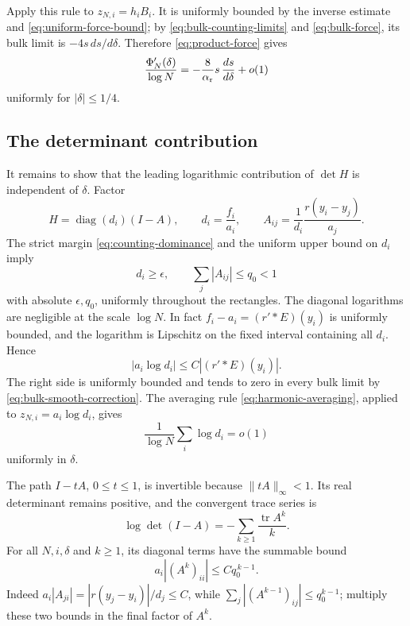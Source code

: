Apply this rule to \(z_{N,i}=h_iB_i\). It is uniformly bounded by the inverse estimate and \eqref{eq:uniform-force-bound}; by
\eqref{eq:bulk-counting-limits} and \eqref{eq:bulk-force}, its bulk limit is
\(-4s\,ds/d\delta\). Therefore \eqref{eq:product-force} gives
\begin{equation}\label{eq:uniform-product-derivative}
 \frac{\Phi_N'(\delta)}{\log N}
 =-\frac8{\alpha_{\rm r}}s\,\frac{ds}{d\delta}+o(1)
\end{equation}
uniformly for \(|\delta|\le1/4\).

\subsection{The determinant contribution}

It remains to show that the leading logarithmic contribution of \(\det H\) is independent of \(\delta\). Factor
\[
 H=\operatorname{diag}(d_i)(I-A),\qquad
 d_i=\frac{f_i}{a_i},\qquad
 A_{ij}=\frac1{d_i}\frac{r(y_i-y_j)}{a_j}.
\]
The strict margin \eqref{eq:counting-dominance} and the uniform upper bound on \(d_i\) imply
\[
 d_i\ge\epsilon,\qquad
 \sum_j|A_{ij}|\le q_0<1
\]
with absolute \(\epsilon,q_0\), uniformly throughout the rectangles. The diagonal logarithms are negligible at the scale \(\log N\). In fact \(f_i-a_i=(r'*E)(y_i)\) is uniformly bounded, and the logarithm is Lipschitz on the fixed interval containing all \(d_i\). Hence
\[
 |a_i\log d_i|\le C|(r'*E)(y_i)|.
\]
The right side is uniformly bounded and tends to zero in every bulk limit by
\eqref{eq:bulk-smooth-correction}. The averaging rule
\eqref{eq:harmonic-averaging}, applied to \(z_{N,i}=a_i\log d_i\), gives
\begin{equation}\label{eq:diagonal-log-negligible}
 \frac1{\log N}\sum_i\log d_i=o(1)
\end{equation}
uniformly in \(\delta\).

The path \(I-tA\), \(0\le t\le1\), is invertible because
\(\|tA\|_\infty<1\). Its real determinant remains positive, and the convergent trace series is
\[
 \log\det(I-A)=-\sum_{k\ge1}\frac{\operatorname{tr}A^k}{k}.
\]
For all \(N,i,\delta\) and \(k\ge1\), its diagonal terms have the summable bound
\begin{equation}\label{eq:trace-term-bound}
 a_i|(A^k)_{ii}|\le Cq_0^{\,k-1}.
\end{equation}
Indeed \(a_i|A_{ji}|=|r(y_j-y_i)|/d_j\le C\), while
\(\sum_j|(A^{k-1})_{ij}|\le q_0^{k-1}\); multiply these two bounds in the final factor of \(A^k\).

